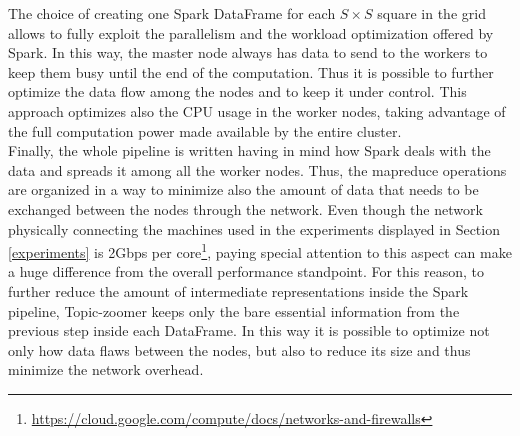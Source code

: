 \documentclass{sig-alternate-05-2015}
\begin{document}
The choice of creating one Spark DataFrame for each $S \times S$ square in the grid allows to fully exploit the parallelism and the workload optimization offered by Spark. In this way, the master node always has data to send to the workers to keep them busy until the end of the computation. Thus it is possible to further optimize the data flow among the nodes and to keep it under control. This approach optimizes also the CPU usage in the worker nodes, taking advantage of the full computation power made available by the entire cluster.\\
Finally, the whole pipeline is written having in mind how Spark deals with the data and spreads it among all the worker nodes. Thus, the map\-reduce operations are organized in a way to minimize also the amount of data that needs to be exchanged between the nodes through the network. Even though the network physically connecting the machines used in the experiments displayed in Section \ref{experiments} is 2Gbps per core\footnote{\url{https://cloud.google.com/compute/docs/networks-and-firewalls}}, paying special attention to this aspect can make a huge difference from the overall performance standpoint. For this reason, to further reduce the amount of intermediate representations inside the Spark pipeline, Topic-zoomer keeps only the bare essential information from the previous step inside each DataFrame. In this way it is possible to optimize not only how data flaws between the nodes, but also to reduce its size and thus minimize the network overhead.
\end{document}

